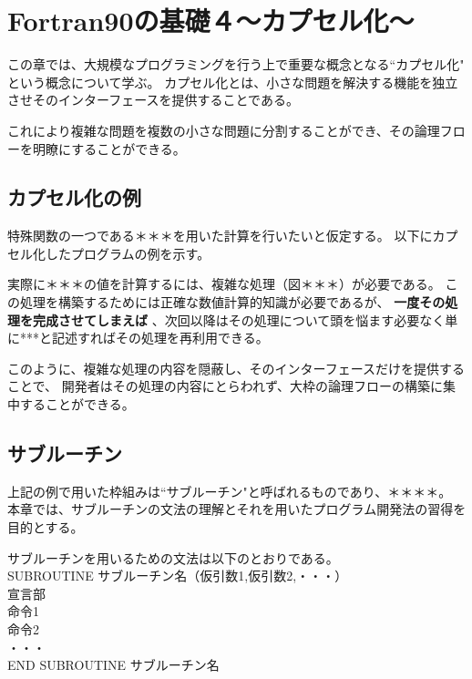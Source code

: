 \chapter{Fortran90の基礎４〜カプセル化〜}
この章では、大規模なプログラミングを行う上で重要な概念となる``カプセル化" という概念について学ぶ。
カプセル化とは、小さな問題を解決する機能を独立させそのインターフェースを提供することである。

これにより複雑な問題を複数の小さな問題に分割することができ、その論理フローを明瞭にすることができる。

\section{カプセル化の例}
特殊関数の一つである＊＊＊を用いた計算を行いたいと仮定する。
以下にカプセル化したプログラムの例を示す。

実際に＊＊＊の値を計算するには、複雑な処理（図＊＊＊）が必要である。
この処理を構築するためには正確な数値計算的知識が必要であるが、
{\bfseries
  一度その処理を完成させてしまえば
}
、次回以降はその処理について頭を悩ます必要なく単に***と記述すればその処理を再利用できる。

このように、複雑な処理の内容を隠蔽し、そのインターフェースだけを提供することで、
開発者はその処理の内容にとらわれず、大枠の論理フローの構築に集中することができる。

\section{サブルーチン}
上記の例で用いた枠組みは``サブルーチン"と呼ばれるものであり、＊＊＊＊。
本章では、サブルーチンの文法の理解とそれを用いたプログラム開発法の習得を目的とする。

サブルーチンを用いるための文法は以下のとおりである。\\
{\ttfamily
  SUBROUTINE サブルーチン名（仮引数1,仮引数2,・・・）\\
  宣言部\\
  命令1\\
  命令2\\
  ・・・\\
  END SUBROUTINE サブルーチン名\\
}\\

